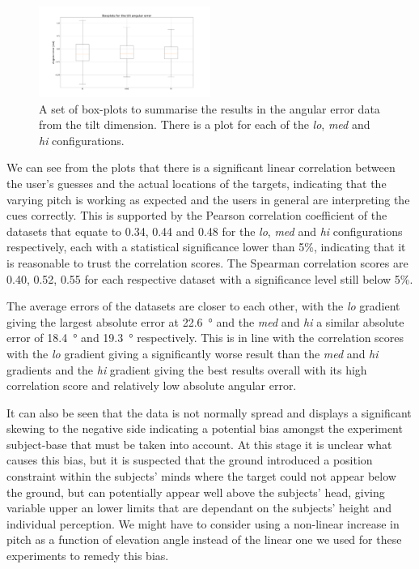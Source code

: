 \documentclass[format=sigconf, review=true, screen=true, anonymous=true]{acmart}
\begin{document}
\begin{figure}
  \centering
  \includegraphics[width=0.5\textwidth]{figures/tilt_error_boxplot.png}
  \caption{A set of box-plots to summarise the results in the angular error data from the tilt dimension. There is a plot for each of the \emph{lo}, \emph{med} and \emph{hi} configurations. }
  \label{fig:tilt-boxplots}
\end{figure}

We can see from the plots that there is a significant linear correlation between the user's guesses and the actual locations of the targets, indicating that the varying pitch is working as expected and the users in general are interpreting the cues correctly. This is supported by the Pearson correlation coefficient of the datasets that equate to 0.34, 0.44 and 0.48 for the \emph{lo}, \emph{med} and \emph{hi} configurations respectively, each with a statistical significance lower than 5\%, indicating that it is reasonable to trust the correlation scores. The Spearman correlation scores are 0.40, 0.52, 0.55 for each respective dataset with a significance level still below 5\%. 

The average errors of the datasets are closer to each other, with the \emph{lo} gradient giving the largest absolute error at \SI{22.6}{\degree} and the \emph{med} and \emph{hi} a similar absolute error of \SI{18.4}{\degree} and \SI{19.3}{\degree} respectively. This is in line with the correlation scores with the \emph{lo} gradient giving a significantly worse result than the \emph{med} and \emph{hi} gradients and the \emph{hi} gradient giving the best results overall with its high correlation score and relatively low absolute angular error. 

It can also be seen that the data is not normally spread and displays a significant skewing to the negative side indicating a potential bias amongst the experiment subject-base that must be taken into account. At this stage it is unclear what causes this bias, but it is suspected that the ground introduced a position constraint within the subjects' minds where the target could not appear below the ground, but can potentially appear well above the subjects' head, giving variable upper an lower limits that are dependant on the subjects' height and individual perception. We might have to consider using a non-linear increase in pitch as a function of elevation angle instead of the linear one we used for these experiments to remedy this bias.
\end{document}
